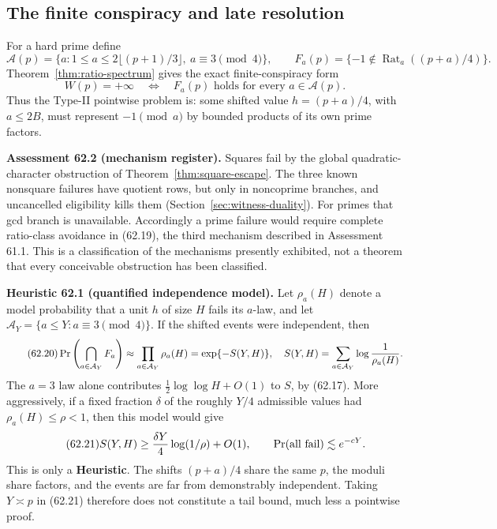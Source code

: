 \documentclass[10pt,reqno]{amsart}
\theoremstyle{definition}
\newcommand{\1}{\mathbf 1}
\begin{document}
\subsection{The finite conspiracy and late resolution}
For a hard prime define
\[
 \mathcal A(p)=\{a:1\leq a\leq2\lfloor(p+1)/3\rfloor,
                         \ a\equiv3\pmod4\},
 \qquad F_a(p)=\{-1\notin\operatorname {Rat}_a((p+a)/4)\}.
\]
Theorem~\ref{thm:ratio-spectrum} gives the exact finite-conspiracy form
\begin{equation}\tag{62.19}
 \boxed{\qquad W(p)=+\infty
       \quad\Longleftrightarrow\quad
       F_a(p)\text{ holds for every }a\in\mathcal A(p).\qquad}
\end{equation}
Thus the Type-II pointwise problem is: some shifted value $h=(p+a)/4$, with
$a\leq2B$, must represent $-1\pmod a$ by bounded products of its own prime
factors.

\medskip\noindent\textbf{Assessment 62.2 (mechanism register).}
Squares fail by the global quadratic-character obstruction of
Theorem~\ref{thm:square-escape}.  The three known nonsquare failures have
quotient rows, but only in noncoprime branches, and uncancelled eligibility
kills them (Section~\ref{sec:witness-duality}).  For primes that gcd branch
is unavailable.  Accordingly a prime failure would require complete
ratio-class avoidance in (62.19), the third mechanism described in
Assessment 61.1.  This is a classification of the mechanisms presently
exhibited, not a theorem that every conceivable obstruction has been
classified.

\medskip\noindent\textbf{Heuristic 62.1 (quantified independence model).}
Let $\rho_a(H)$ denote a model probability that a unit $h$ of size $H$ fails
its $a$-law, and let
$\mathcal A_Y=\{a\leq Y:a\equiv3\pmod4\}$.  If the shifted events were
independent, then
\begin{equation}\tag{62.20}
 \Pr\left(\bigcap_{a\in\mathcal A_Y}F_a\right)
   \approx\prod_{a\in\mathcal A_Y}\rho_a(H)
   =\exp\{-S(Y,H)\},
 \quad S(Y,H)=\sum_{a\in\mathcal A_Y}\log{1\over\rho_a(H)}.
\end{equation}
The $a=3$ law alone contributes $\tfrac12\log\log H+O(1)$ to $S$, by
(62.17).  More aggressively, if a fixed fraction $\delta$ of the roughly
$Y/4$ admissible values had $\rho_a(H)\leq\rho<1$, then this model would
give
\begin{equation}\tag{62.21}
 S(Y,H)\geq {\delta Y\over4}\log(1/\rho)+O(1),
 \qquad \Pr(\text{all fail})\lesssim e^{-cY}.
\end{equation}
This is only a \textbf{Heuristic}.  The shifts $(p+a)/4$ share the same
$p$, the moduli share factors, and the events are far from demonstrably
independent.  Taking $Y\asymp p$ in (62.21) therefore does not constitute a
tail bound, much less a pointwise proof.
\end{document}
